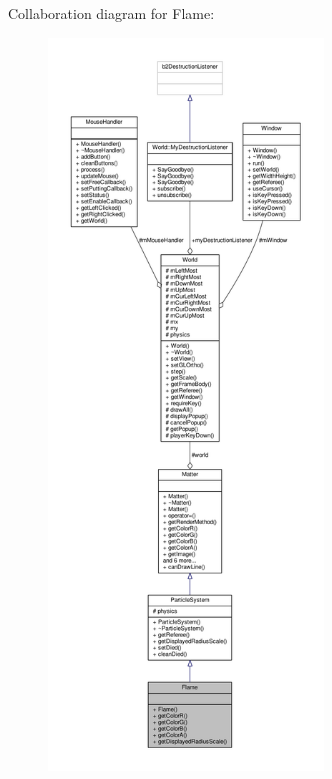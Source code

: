 Collaboration diagram for Flame\+:\nopagebreak
\begin{figure}[H]
\begin{center}
\leavevmode
\includegraphics[height=550pt]{classFlame__coll__graph}
\end{center}
\end{figure}
